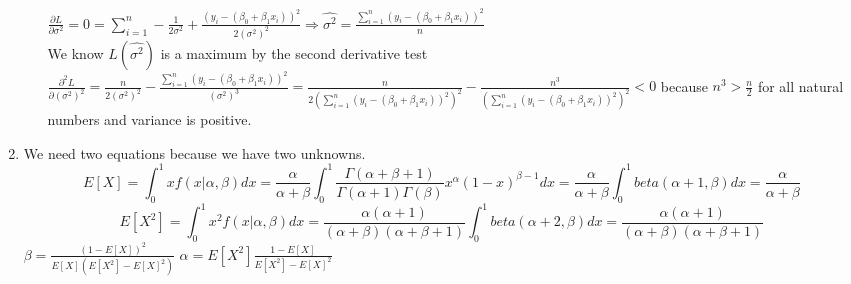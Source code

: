 \documentclass[10pt]{article}
\begin{document}
\begin{enumerate}[label=\textbf{Problem \arabic*.}]
\begin{itemize}
        $\displaystyle\frac{\partial L}{\partial \sigma^2}=0=\sum_{i=1}^{n}-\frac{1}{2\sigma^2}+\frac{{(y_i-(\beta_0+\beta_1x_i))}^2}{2{(\sigma^2)}^2}\Rightarrow\hat{\sigma^2}=\frac{\displaystyle\sum_{i=1}^{n}{(y_i-(\beta_0+\beta_1x_i))}^2}{n}$\\
        We know $L(\hat{\sigma^2})$ is a maximum by the second derivative test $\displaystyle\frac{\partial^2L}{\partial {(\sigma^2)}^2}=\frac{n}{2{(\sigma^2)}^2}-\frac{\sum_{i=1}^{n}{(y_i-(\beta_0+\beta_1x_i))}^2}{{(\sigma^2)}^3}=\frac{n}{2{(\sum_{i=1}^{n}{(y_i-(\beta_0+\beta_1x_i))}^2)}^2}-\frac{n^3}{{(\sum_{i=1}^{n}{(y_i-(\beta_0+\beta_1x_i))}^2)}^2}<0$ because $n^3>\frac{n}{2}$ for all natural numbers and variance is positive.
    \end{itemize}
    \item We need two equations because we have two unknowns.
    $$E[X]=\int_{0}^{1}xf(x|\alpha,\beta)dx=\frac{\alpha}{\alpha+\beta}\int_{0}^{1}\frac{\Gamma(\alpha+\beta+1)}{\Gamma(\alpha+1)\Gamma(\beta)}x^\alpha{(1-x)}^{\beta-1}dx=\frac{\alpha}{\alpha+\beta}\int_{0}^{1}beta(\alpha+1,\beta)dx=\frac{\alpha}{\alpha+\beta}$$
    $$E[X^2]=\int_{0}^{1}x^2f(x|\alpha,\beta)dx=\frac{\alpha(\alpha+1)}{(\alpha+\beta)(\alpha+\beta+1)}\int_{0}^{1}beta(\alpha+2,\beta)dx=\frac{\alpha(\alpha+1)}{(\alpha+\beta)(\alpha+\beta+1)}$$
    $\beta=\frac{{(1-E[X])}^2}{E[X](E[X^2]-E[X]^2)}$
    $\alpha=E[X^2]\frac{1-E[X]}{E[X^2]-E[X]^2}$
\end{enumerate}
\end{document}
